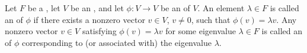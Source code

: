 \begin{definition} \label{definition:eigenvalue_and_eigenvector_of_an_endomorphism_of_a_vector_space_over_a_field}
Let $F$ be a , let $V$ be an , and let $\phi : V \to V$ be an  of $V$.
An element $\lambda \in F$ is called an  of $\phi$ if there exists a nonzero vector $v \in V$, $v \neq 0$, such that
$\phi(v) = \lambda v.$
Any nonzero vector $v \in V$ satisfying $\phi(v) = \lambda v$ for some eigenvalue $\lambda \in F$ is called an  of $\phi$ corresponding to (or associated with) the eigenvalue $\lambda$.
\end{definition}
